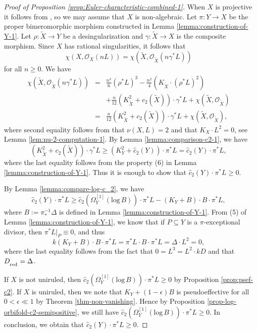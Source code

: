 \documentclass[12pt]{amsart}
\newcommand{\<}{\leq}
\def\>{\geq}
\def\subset{\subseteq}
\theoremstyle{remark}
\theoremstyle{definition}
\theoremstyle{definition}
\numberwithin{equation}{section}
\theoremstyle{definition}
\theoremstyle{definition}
\def\red{\operatorname{\textsubscript{\rm red}}}
\begin{document}
\begin{proof}
[{Proof of Proposition \ref{prop:Euler-characteristic-combined-1}}]
When $X$ is projective it follows from \cite[Equation (14.4.1.2)]{Kol92}, so we may assume that $X$ is non-algebraic. Let $\pi:Y\to X$ be the proper bimeromorphic morphism constructed in Lemma \ref{lemma:construction-of-Y-1}. 
Let $\rho:\widetilde{X} \to Y$ be a desingularization and $\gamma\colon \widetilde{X} \to X$ is the composite morphism. 
Since $X$ has rational singularities, it follows that 
\[\chi(X, \mathscr{O}_{{X}}(n L)) = \chi(\widetilde{X}, \mathscr{O}_{\widetilde{X}}(n\gamma^*L) )\]
for all $n \> 0$.  
We have  
\begin{eqnarray*}
    \chi(\widetilde{X}, \mathscr{O}_{\widetilde{X}}(n\gamma^*L) ) &= & \frac{n^3}{6}(\rho^*L)^3-\frac{n^2}{4} (K_{\widetilde X}\cdot(\rho^*L)^2)\\ 
     &&  +\frac{n}{12}(K_{\widetilde{X}}^2+c_2(\widetilde{X})) \cdot \gamma^*L  + \chi(\widetilde{X}, \mathscr{O}_{\widetilde{X}})\\
     &=& \frac{n}{12}(K_{\widetilde{X}}^2+c_2(\widetilde{X})) \cdot \gamma^*L + \chi(\widetilde{X}, \mathscr{O}_{\widetilde{X}}),
\end{eqnarray*}
where second equality follows from that $\nu(X, L)=2$ and that $K_X\cdot L^2=0$, see Lemma \ref{lem:nu-2-computation-1}.
By Lemma \ref{lemma:comparison-c2-1}, we have 
\[(K_{\widetilde{X}}^2+c_2(\widetilde{X}))\cdot \gamma^*L  \> (K_{Y}^2+\hat{c}_2(Y)) \cdot \pi^*L = \hat{c}_2(Y) \cdot \pi^*L,\]
where the last equality follows from the property (6)  in  Lemma \ref{lemma:construction-of-Y-1}.
Thus it is enough to show that $\hat{c}_2(Y) \cdot \pi^*L \> 0$. 
 

By Lemma \ref{lemma:compare-log-c_2}, we have 
\[
\hat{c}_2(Y)  \cdot \pi^*L \> 
\hat{c}_2(\Omega_Y^{[1]}(\mathrm{log}\, B)) \cdot \pi^*L - (K_Y+B)\cdot B\cdot \pi^*L,
\]
where $B:=\pi^{-1}_*\Delta$ is defined in Lemma \ref{lemma:construction-of-Y-1}. 
From (5) of Lemma \ref{lemma:construction-of-Y-1},  we  know that if $P\subset Y$ is a $\pi$-exceptional divisor, then $\pi^*L|_P\equiv 0$, and thus 
\[
k(K_Y+B)\cdot B\cdot \pi^*L = \pi^*L \cdot B \cdot \pi^*L= \Delta \cdot L^2 = 0,
\]
where the last equality follows from the fact that $0=L^3=L^2\cdot kD$ and that $D_{\red}=\Delta$. 

If $X$ is not uniruled, then  $\hat{c}_2(\Omega_Y^{[1]}(\mathrm{log}\, B)) \cdot \pi^*L \> 0$ by Proposition \ref{prop:psef-c2}. 
If $X$ is uniruled, then we note that  $K_Y+(1-\epsilon) B$ is pseudoeffective for all $0<\epsilon\ll 1$ by Theorem \ref{thm-non-vanishing}.  
Hence by Proposition \ref{prop-log-orbifold-c2-semipositive}, we still have $\hat{c}_2(\Omega_Y^{[1]}(\mathrm{log}\, B)) \cdot \pi^*L \> 0$.  
In conclusion, we obtain that $\hat{c}_2(Y)  \cdot \pi^*L \> 0$. 


\end{proof}
\end{document}
